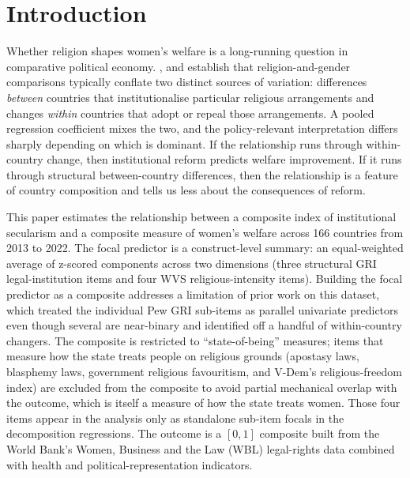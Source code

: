 \documentclass[12pt,a4paper]{article}
\begin{document}
\section{Introduction}

Whether religion shapes women's welfare is a long-running question in comparative political economy. \citet{Ross2008}, \citet{Seguino2011} and \citet{HtunWeldon2015} establish that religion-and-gender comparisons typically conflate two distinct sources of variation: differences \emph{between} countries that institutionalise particular religious arrangements and changes \emph{within} countries that adopt or repeal those arrangements. A pooled regression coefficient mixes the two, and the policy-relevant interpretation differs sharply depending on which is dominant. If the relationship runs through within-country change, then institutional reform predicts welfare improvement. If it runs through structural between-country differences, then the relationship is a feature of country composition and tells us less about the consequences of reform.

This paper estimates the relationship between a composite index of institutional secularism and a composite measure of women's welfare across 166 countries from 2013 to 2022. The focal predictor is a construct-level summary: an equal-weighted average of z-scored components across two dimensions (three structural GRI legal-institution items and four WVS religious-intensity items). Building the focal predictor as a composite addresses a limitation of prior work on this dataset, which treated the individual Pew GRI sub-items as parallel univariate predictors even though several are near-binary and identified off a handful of within-country changers. The composite is restricted to ``state-of-being'' measures; items that measure how the state treats people on religious grounds (apostasy laws, blasphemy laws, government religious favouritism, and V-Dem's religious-freedom index) are excluded from the composite to avoid partial mechanical overlap with the outcome, which is itself a measure of how the state treats women. Those four items appear in the analysis only as standalone sub-item focals in the decomposition regressions. The outcome is a $[0, 1]$ composite built from the World Bank's Women, Business and the Law (WBL) legal-rights data combined with health and political-representation indicators.
\end{document}
